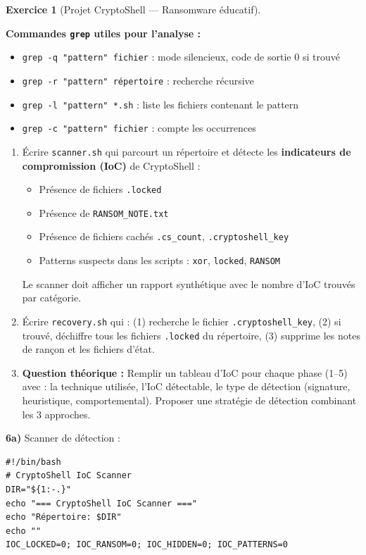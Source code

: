 \documentclass[a4paper,11pt]{article}
\theoremstyle{plain}
\theoremstyle{definition}
\newtheorem{exercice}{Exercice}
\begin{document}
\begin{exercice}[Projet CryptoShell --- Ransomware éducatif]
\begin{rappel}
\medskip
\textbf{Commandes \texttt{grep} utiles pour l'analyse :}
\begin{itemize}
    \item \texttt{grep -q "pattern" fichier} : mode silencieux, code de sortie 0 si trouvé
    \item \texttt{grep -r "pattern" répertoire} : recherche récursive
    \item \texttt{grep -l "pattern" *.sh} : liste les fichiers contenant le pattern
    \item \texttt{grep -c "pattern" fichier} : compte les occurrences
\end{itemize}
\end{rappel}

\begin{enumerate}
\item[\textbf{6a)}] Écrire \texttt{scanner.sh} qui parcourt un répertoire et détecte les \textbf{indicateurs de compromission (IoC)} de CryptoShell :
\begin{itemize}
    \item Présence de fichiers \texttt{.locked}
    \item Présence de \texttt{RANSOM\_NOTE.txt}
    \item Présence de fichiers cachés \texttt{.cs\_count}, \texttt{.cryptoshell\_key}
    \item Patterns suspects dans les scripts : \texttt{xor}, \texttt{locked}, \texttt{RANSOM}
\end{itemize}
Le scanner doit afficher un rapport synthétique avec le nombre d'IoC trouvés par catégorie.

\item[\textbf{6b)}] Écrire \texttt{recovery.sh} qui : (1) recherche le fichier \texttt{.cryptoshell\_key}, (2) si trouvé, déchiffre tous les fichiers \texttt{.locked} du répertoire, (3) supprime les notes de rançon et les fichiers d'état.

\item[\textbf{6c)}] \textbf{Question théorique :} Remplir un tableau d'IoC pour chaque phase (1--5) avec : la technique utilisée, l'IoC détectable, le type de détection (signature, heuristique, comportemental). Proposer une stratégie de détection combinant les 3 approches.
\end{enumerate}

\begin{correction}

\textbf{6a)} Scanner de détection :
\begin{lstlisting}[title=scanner.sh (phase6\_scanner.sh)]
#!/bin/bash
# CryptoShell IoC Scanner
DIR="${1:-.}"
echo "=== CryptoShell IoC Scanner ==="
echo "Répertoire: $DIR"
echo ""
IOC_LOCKED=0; IOC_RANSOM=0; IOC_HIDDEN=0; IOC_PATTERNS=0


\end{lstlisting}
\end{correction}
\end{exercice}
\end{document}

